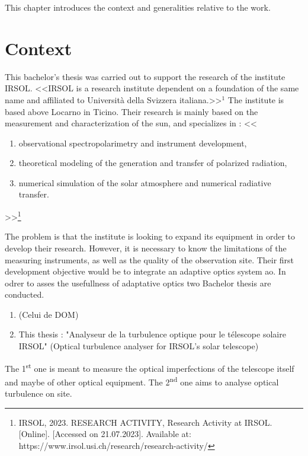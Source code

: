 This chapter introduces the context and generalities relative to the work.



\section{Context}
This bachelor's thesis was carried out to support the research of the institute \Gls{IRSOL}. \newline
<<\Gls{IRSOL} is a research institute dependent on a foundation of the same name and affiliated to Università della Svizzera italiana.>>$^1$
The institute is based above Locarno in Ticino. \newline
Their research is mainly based on the measurement and characterization of the sun, and specializes in :
<<
\begin{enumerate}
    \item observational spectropolarimetry and instrument development,
    \item theoretical modeling of the generation and transfer of polarized radiation,
    \item numerical simulation of the solar atmosphere and numerical radiative transfer.
\end{enumerate}>>\footnote{\cite{IRSOL_research} IRSOL, 2023. RESEARCH ACTIVITY, Research Activity at IRSOL. [Online]. [Accessed on 21.07.2023]. Available at: https://www.irsol.usi.ch/research/research-activity/}

The problem is that the institute is looking to expand its equipment in order to develop their research.
However, it is necessary to know the limitations of the measuring instruments, as well as the quality of the observation site.
Their first development objective would be to integrate an adaptive optics system \acrfull{ao}.
\newline
In odrer to asses the usefullness of adaptative optics two Bachelor thesis are conducted.
\begin{enumerate}
    \item (Celui de DOM)
    \item This thesis : "Analyseur de la turbulence optique pour le télescope solaire IRSOL" (Optical turbulence analyser for \Gls{IRSOL}'s solar telescope)
\end{enumerate}
The 1\textsuperscript{st} one is meant to measure the optical imperfections of the telescope itself and maybe of other optical equipment.
The 2\textsuperscript{nd} one aims to analyse optical turbulence on site.

